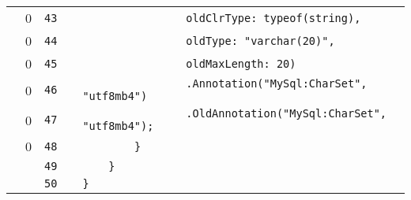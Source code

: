 \documentclass[a4paper,landscape,10pt]{article}
\begin{document}
\begin{longtable}[l]{lrrll}
\cellcolor{red} & 0 & \verb~43~ & & \verb~                oldClrType: typeof(string),~\\
\cellcolor{red} & 0 & \verb~44~ & & \verb~                oldType: "varchar(20)",~\\
\cellcolor{red} & 0 & \verb~45~ & & \verb~                oldMaxLength: 20)~\\
\cellcolor{red} & 0 & \verb~46~ & & \verb~                .Annotation("MySql:CharSet", "utf8mb4")~\\
\cellcolor{red} & 0 & \verb~47~ & & \verb~                .OldAnnotation("MySql:CharSet", "utf8mb4");~\\
\cellcolor{red} & 0 & \verb~48~ & & \verb~        }~\\
\cellcolor{gray} &  & \verb~49~ & & \verb~    }~\\
\cellcolor{gray} &  & \verb~50~ & & \verb~}~\\
\end{longtable}
\end{document}
